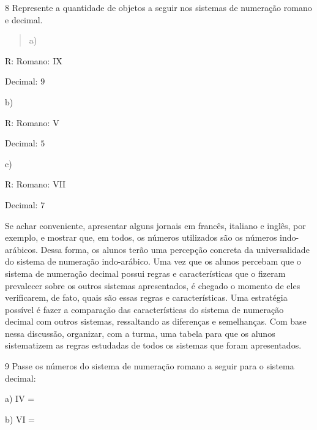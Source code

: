 \num{8}  Represente a quantidade de objetos a seguir nos sistemas de numeração
romano e decimal.

\begin{quote}
a)
\end{quote}


R: Romano: IX

Decimal: $9$

b)


R: Romano: V

Decimal: $5$

c)


R: Romano: VII

Decimal: $7$

Se achar conveniente, apresentar alguns jornais em francês, italiano e
inglês, por exemplo, e mostrar que, em todos, os números utilizados são
os números indo-arábicos. Dessa forma, os alunos terão uma percepção
concreta da universalidade do sistema de numeração indo-arábico. Uma vez
que os alunos percebam que o sistema de numeração decimal possui regras
e características que o fizeram prevalecer sobre os outros sistemas
apresentados, é chegado o momento de eles verificarem, de fato, quais
são essas regras e características. Uma estratégia possível é fazer a
comparação das características do sistema de numeração decimal com
outros sistemas, ressaltando as diferenças e semelhanças. Com base nessa
discussão, organizar, com a turma, uma tabela para que os alunos
sistematizem as regras estudadas de todos os sistemas que foram
apresentados.

\num{9}  Passe os números do sistema de numeração romano a seguir para o
sistema decimal:

a) IV =

b) VI =

